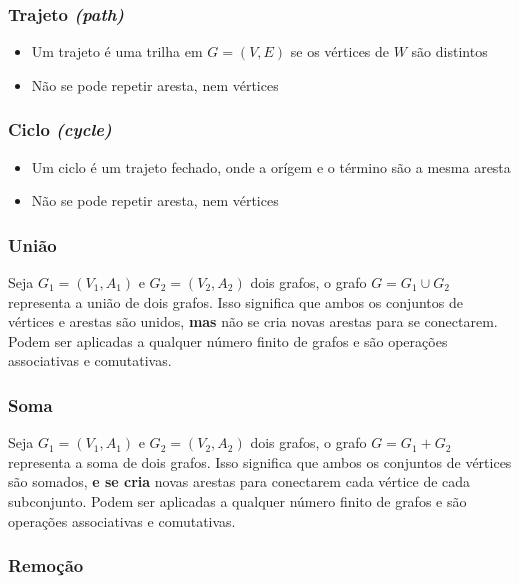 \documentclass[12pt]{article}
\begin{document}
\subsubsection{Trajeto \textit{(path)}}
\begin{itemize}
	\item Um trajeto é uma trilha em $G = (V, E)$ se os vértices de $W$ são distintos
	\item Não se pode repetir aresta, nem vértices
\end{itemize}

\subsubsection{Ciclo \textit{(cycle)}}
\begin{itemize}
	\item Um ciclo é um trajeto fechado, onde a orígem e o término são a mesma aresta
	\item Não se pode repetir aresta, nem vértices
\end{itemize}

\subsubsection{União}
Seja $G_1=(V_1, A_1)$ e $G_2 = (V_2, A_2)$ dois grafos, o grafo $G = G_1 \cup G_2$ representa a união de dois grafos.
Isso significa que ambos os conjuntos de vértices e arestas são unidos, \textbf{mas} não se cria novas arestas para se conectarem.
Podem ser aplicadas a qualquer número finito de grafos e são operações associativas e comutativas.

\subsubsection{Soma}
Seja $G_1=(V_1, A_1)$ e $G_2 = (V_2, A_2)$ dois grafos, o grafo $G = G_1 + G_2$ representa a soma de dois grafos.
Isso significa que ambos os conjuntos de vértices são somados, \textbf{e se cria} novas arestas para conectarem cada vértice de cada subconjunto.
Podem ser aplicadas a qualquer número finito de grafos e são operações associativas e comutativas.

\subsubsection{Remoção}
\end{document}
